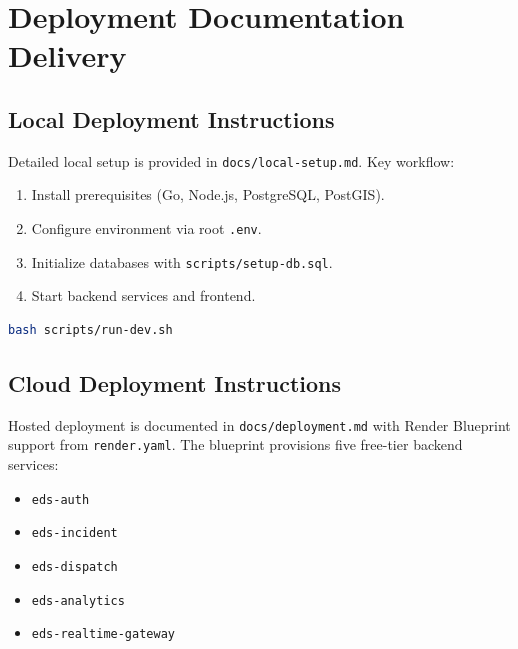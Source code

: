 \documentclass[12pt,a4paper]{report}
\begin{document}
\newpage

\chapter{Deployment Documentation Delivery}

\section{Local Deployment Instructions}

Detailed local setup is provided in \texttt{docs/local-setup.md}. Key workflow:

\begin{enumerate}
	\item Install prerequisites (Go, Node.js, PostgreSQL, PostGIS).
	\item Configure environment via root \texttt{.env}.
	\item Initialize databases with \texttt{scripts/setup-db.sql}.
	\item Start backend services and frontend.
\end{enumerate}

\begin{lstlisting}[language=bash, caption=Single Command Local Startup, numbers=none]
bash scripts/run-dev.sh
\end{lstlisting}

\section{Cloud Deployment Instructions}

Hosted deployment is documented in \texttt{docs/deployment.md} with Render Blueprint support from \texttt{render.yaml}. The blueprint provisions five free-tier backend services:

\begin{itemize}
	\item \texttt{eds-auth}
	\item \texttt{eds-incident}
	\item \texttt{eds-dispatch}
	\item \texttt{eds-analytics}
	\item \texttt{eds-realtime-gateway}
\end{itemize}
\end{document}
